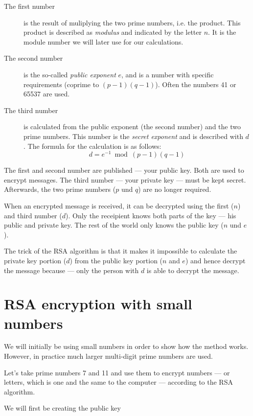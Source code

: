 \documentclass[a4paper,11pt,oneside,openright,titlepage]{scrbook}
\begin{document}
\begin{description}
\item [The first number] is the result of muliplying the two prime
    numbers, i.e. the product. This product is described as
    \textit{modulus} and indicated by the letter $n$. It is the module
    number we will later use for our calculations.

\item [The second number] is the so-called \textit{public exponent}
    $e$, and is a number with specific requirements (coprime to
    $(p-1)(q-1)$). Often the numbers 41 or 65537 are used.

\item [The third number] is calculated from the public exponent (the
    second number) and the two prime numbers. This number is the
    \textit{secret exponent} and is described with $d$. The formula
    for the calculation is as follows:
    \[ d = e^{-1} \bmod (p - 1)(q -1) \]
\end{description}

The first and second number are published --- your public key. Both
are used to encrypt messages. The third number --- your private key
--- must be kept secret. Afterwards, the two prime numbers ($p$ und
$q$) are no longer required.

When an encrypted message is received, it can be decrypted using the
first ($n$) and third number ($d$). Only the receipient knows both
parts of the key --- his public and private key. The rest of the world
only knows the public key ($n$ und $e$).

The trick of the RSA algorithm is that it makes it impossible to
calculate the private key portion ($d$) from the public key portion
($n$ and $e$) and hence decrypt the message because --- only the
person with $d$ is able to decrypt the message.


\clearpage
\section{RSA encryption with small numbers}

We will initially be using small numbers in order to show how the
method works. However, in practice much larger multi-digit prime
numbers are used.

Let's take prime numbers 7 and 11 and use them to encrypt numbers ---
or letters, which is one and the same to the computer --- according to
the RSA algorithm.

We will first be creating the public key
\end{document}
